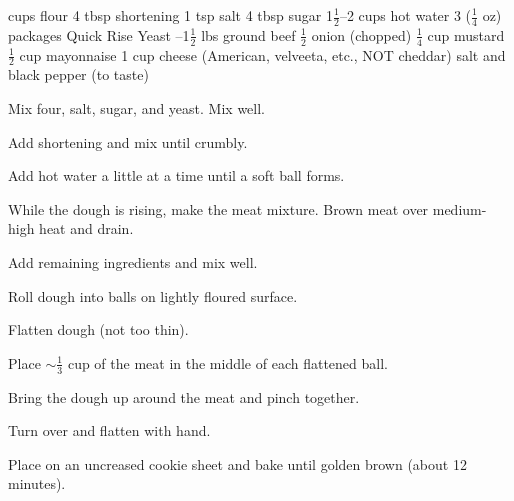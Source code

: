 \dishtype{\main}
\begin{ingreds}
     cups flour
        4 tbsp shortening
        1 tsp salt
        4 tbsp sugar       
        1$\frac{1}{2}$--2 cups hot water
        3 ($\frac{1}{4}$ oz) packages Quick Rise Yeast 
    \columnbreak{}
    --1$\frac{1}{2}$ lbs ground beef
        $\frac{1}{2}$ onion (chopped)
        $\frac{1}{4}$ cup mustard
        $\frac{1}{2}$ cup mayonnaise
        1 cup cheese (American, velveeta, etc., NOT cheddar)
        salt and black pepper (to taste)
\end{ingreds}
\begin{method}
        Mix four, salt, sugar, and yeast. Mix well.\par
        Add shortening and mix until crumbly.\par
        Add hot water a little at a time until a soft ball forms.\par
        While the dough is rising, make the meat mixture.
        Brown meat over medium-high heat and drain.\par
        Add remaining ingredients and mix well.\par
        Roll dough into balls on lightly floured surface.\par
        Flatten dough (not too thin).\par
        Place $\sim\frac{1}{3}$ cup of the meat in the middle of each flattened ball.\par
        Bring the dough up around the meat and pinch together.\par
        Turn over and flatten with hand.\par
        Place on an uncreased cookie sheet and bake until golden brown (about 12 minutes).
\end{method}